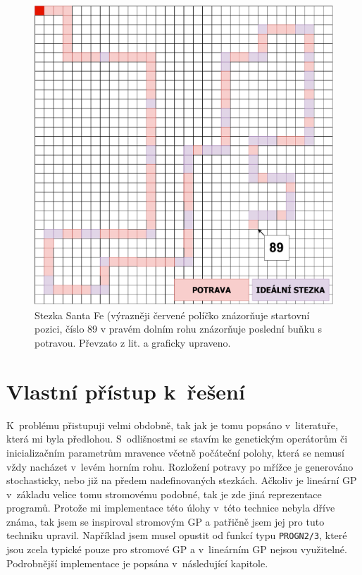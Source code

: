\begin{figure}[!h]
    \centering
    \includegraphics[scale=0.35]{obrazky-figures/santafe.pdf}
    \caption{Stezka Santa Fe (výrazněji červené políčko znázorňuje startovní pozici, číslo 89 v pravém dolním rohu znázorňuje poslední buňku s potravou. Převzato z lit. \cite[str. 55]{Brameier1998} a graficky upraveno.}
    \label{fig:santa-fe}
\end{figure}


\section{Vlastní přístup k~řešení}
K~problému přistupuji velmi obdobně, tak jak je tomu popsáno v~literatuře, která mi byla předlohou. S~odlišnostmi se stavím ke genetickým operátorům či inicializačním parametrům mravence včetně počáteční polohy, která se nemusí vždy nacházet v~levém horním rohu. Rozložení potravy po mřížce je generováno stochasticky, nebo již na předem nadefinovaných stezkách. Ačkoliv je lineární GP v~základu velice tomu stromovému podobné, tak je zde jiná reprezentace programů. Protože mi implementace této úlohy v~této technice nebyla dříve známa, tak jsem se inspiroval stromovým GP a patřičně jsem jej pro tuto techniku upravil. Například jsem musel opustit od funkcí typu \texttt{PROGN2/3}, které jsou zcela typické pouze pro stromové GP a v~lineárním GP nejsou využitelné. Podrobnější implementace je popsána v~následující kapitole.


